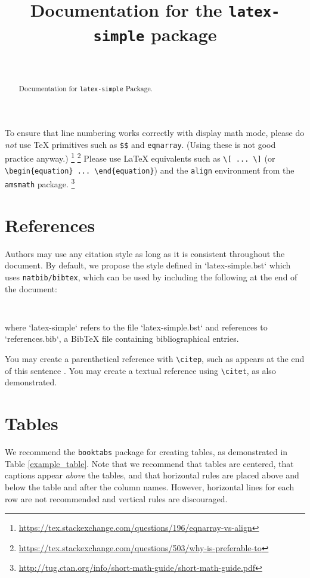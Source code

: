 \documentclass[11pt]{article}
\title{Documentation for the \texttt{latex-simple} package}
\author[1]{\nameemail{Author 1}{email1@example.com}}
\author[2,3]{\nameemail{Author 2}{email2@example.com}}
\author[3]{\nameemail{Author 3}{email3@example.com}}
\author[4]{\nameemail{Author 4}{email4@example.com}}
\author[3]{\\\nameemail{Author 5}{email5@example.com}}
\affil[1]{Institution 1}
\affil[2]{Institution 2}
\affil[3]{Institution 3}
\affil[4]{Institution 4}
\begin{document}
\maketitle

\begin{abstract}
  Documentation for \texttt{latex-simple} Package.
\end{abstract}

To ensure that line numbering works correctly with display math mode, please do \emph{not} use \TeX{} primitives such as \verb|$$| and \texttt{eqnarray}.  (Using these is not good practice anyway.)%
%
\footnote{\url{https://tex.stackexchange.com/questions/196/eqnarray-vs-align}}%
\footnote{\url{https://tex.stackexchange.com/questions/503/why-is-preferable-to}}
%
Please use \LaTeX{} equivalents such as \verb|\[ ... \]| (or \verb|\begin{equation} ... \end{equation}|) and the \texttt{align} environment from the \texttt{amsmath} package.%
%
\footnote{\url{http://tug.ctan.org/info/short-math-guide/short-math-guide.pdf}}

\section{References}

Authors may use any citation style as long as it is consistent throughout the
document. By default, we propose the style defined in `latex-simple.bst` which uses \texttt{natbib/bibtex}, which can be used by including the following at the end of the document:

\begin{verbatim}


\end{verbatim}

where `latex-simple` refers to the file `latex-simple.bst` and references to `references.bib`, a BibTeX file containing bibliographical entries.

You may create a parenthetical reference with \verb|\citep|, such as appears at the end of this sentence \citep{mitchell2003venus}. You may create a textual reference using \verb|\citet|, as \citet{mitchell2003venus} also demonstrated.

\section{Tables}

We recommend the \texttt{booktabs} package for creating tables, as demonstrated in Table \ref{example_table}. Note that we recommend that tables are centered, that captions appear \emph{above} the tables, and that horizontal rules are placed above and below the table and after the column names. However, horizontal lines for each row are not recommended and vertical rules are discouraged.
\end{document}
